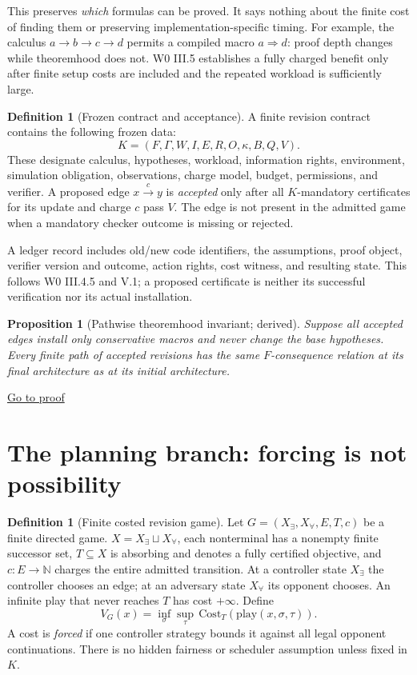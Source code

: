 \documentclass[11pt,letterpaper]{article}
\newtheorem{proposition}[theorem]{Proposition}
\theoremstyle{definition}
\newtheorem{definition}[theorem]{Definition}
\theoremstyle{remark}
\newcommand{\N}{\mathbb{N}}
\newcommand{\backproof}[1]{\hfill\hyperlink{proof:#1}{\footnotesize Go to proof}}
\begin{document}
This preserves \emph{which} formulas can be proved. It says nothing about the finite cost of finding them or preserving implementation-specific timing. For example, the calculus $a\to b\to c\to d$ permits a compiled macro $a\Rightarrow d$: proof depth changes while theoremhood does not. W0 III.5 establishes a fully charged benefit only after finite setup costs are included and the repeated workload is sufficiently large.

\begin{definition}[Frozen contract and acceptance]
A finite revision contract contains the following frozen data:\[K=(F,\Gamma,W,I,E,R,O,\kappa,B,Q,V).\] These designate calculus, hypotheses, workload, information rights, environment, simulation obligation, observations, charge model, budget, permissions, and verifier. A proposed edge $x\xrightarrow{c}y$ is \emph{accepted} only after all $K$-mandatory certificates for its update and charge $c$ pass $V$. The edge is not present in the admitted game when a mandatory checker outcome is missing or rejected.
\end{definition}

A ledger record includes old/new code identifiers, the assumptions, proof object, verifier version and outcome, action rights, cost witness, and resulting state. This follows W0 III.4.5 and V.1; a proposed certificate is neither its successful verification nor its actual installation.

\begin{proposition}[Pathwise theoremhood invariant; derived]\label{prop:path}\hypertarget{stmt:path}{}
Suppose all accepted edges install only conservative macros and never change the base hypotheses. Every finite path of accepted revisions has the same $F$-consequence relation at its final architecture as at its initial architecture.
\end{proposition}\backproof{path}

\section{The planning branch: forcing is not possibility}
\begin{definition}[Finite costed revision game]
Let $G=(X_\exists,X_\forall,E,T,c)$ be a finite directed game. $X=X_\exists\sqcup X_\forall$, each nonterminal has a nonempty finite successor set, $T\subseteq X$ is absorbing and denotes a fully certified objective, and $c:E\to\N$ charges the entire admitted transition. At a controller state $X_\exists$ the controller chooses an edge; at an adversary state $X_\forall$ its opponent chooses. An infinite play that never reaches $T$ has cost $+\infty$. Define
\[
  V_G(x)=\inf_{\sigma}\sup_{\tau}\,\mathrm{Cost}_{T}(\mathrm{play}(x,\sigma,\tau)).
\]
A cost is \emph{forced} if one controller strategy bounds it against all legal opponent continuations. There is no hidden fairness or scheduler assumption unless fixed in $K$.
\end{definition}
\end{document}
